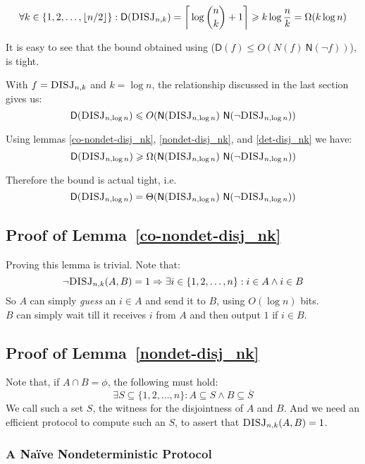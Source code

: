 \documentclass[usletter]{article}
\newcommand {\complexity}[1] {\ensuremath{\mathsf{#1}}}
\newcommand {\D}             {\complexity{D}}
\newcommand {\N}             {\complexity{N}}
\newcommand {\function}[2]  {\ensuremath{\textsc{#1}_{#2}}}
\newcommand {\DISJ}[2]      {\function{DISJ}{#1,#2}}
\newcommand {\bigO}     {\ensuremath{O}}
\newcommand {\bigT}     {\ensuremath{\Theta}}
\newcommand {\bigW}     {\ensuremath{\Omega}}
\newcommand {\range}[2]  {\ensuremath{\{#1{1},#1{2},\ldots,#1{#2}\}}}
\begin{document}
\begin{lemma}
\label{det-disj_nk}
$$
\forall k \in \{1,2,\ldots,\lfloor n/2 \rfloor\} :
  \D(\DISJ{n}{k}) = \bigg\lceil \log{\binom{n}{k} + 1} \bigg\rceil
                  \geqslant k \log{\frac{n}{k}}
                  = \bigW(k \log{n})
$$
\end{lemma}

\noindent
It is easy to see that the bound obtained using ($\D(f) \leqslant \bigO(N(f) \ \N(\neg f))$), is tight.

\noindent
With $f = \DISJ{n}{k}$ and $k = \log{n}$, the relationship discussed in the last section gives us:
$$
\D(\DISJ{n}{\log{n}}) \leqslant \bigO(\N(\DISJ{n}{\log{n}}) \ \N(\neg \DISJ{n}{\log{n}}))
$$

\noindent
Using lemmas \ref{co-nondet-disj_nk}, \ref{nondet-disj_nk}, and \ref{det-disj_nk} we have:
$$
\D(\DISJ{n}{\log{n}}) \geqslant \bigW(\N(\DISJ{n}{\log{n}}) \ \N(\neg \DISJ{n}{\log{n}}))
$$

\noindent
Therefore the bound is actual tight, i.e.
$$
\D(\DISJ{n}{\log{n}}) = \bigT(\N(\DISJ{n}{\log{n}}) \ \N(\neg \DISJ{n}{\log{n}}))
$$



\subsection{Proof of Lemma~\ref{co-nondet-disj_nk}}
Proving this lemma is trivial. Note that:
$$
\neg\DISJ{n}{k}(A, B) = 1 \Rightarrow \exists i \in \range{}{n} : i \in A \wedge i \in B
$$
So $A$ can simply \textit{guess} an $i \in A$ and send it to $B$, using $O(\log{n})$ bits. \\$B$ can simply wait till it receives $i$ from $A$ and then output $1$ if $i \in B$.



\subsection{Proof of Lemma~\ref{nondet-disj_nk}}

Note that, if $A \cap B = \phi$, the following must hold:
$$
\exists S \subseteq \range{}{n} : A \subseteq S \wedge B \subseteq \overline{S}
$$
We call such a set $S$, the witness for the disjointness of $A$ and $B$. And we need an efficient protocol to compute such an $S$, to assert that $\DISJ{n}{k}(A, B) = 1$.

\subsubsection*{A Na\"{i}ve Nondeterministic Protocol}
\end{document}
